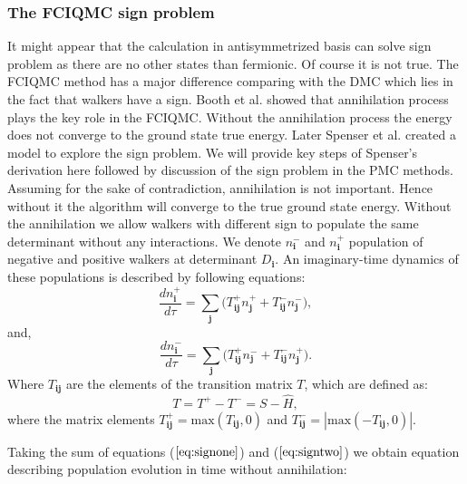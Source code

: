 \documentclass[twoside,english]{uiofysmaster}
\begin{document}
\subsubsection{The FCIQMC sign problem}
It might appear that the calculation in antisymmetrized basis can solve sign problem as there are no other states than fermionic. Of course it is not true.
The FCIQMC method has a major difference comparing with the DMC which lies in the fact that walkers have a sign. Booth et al. \cite{BoothFermionMonteCarlo2009} showed that annihilation process plays the key role in the FCIQMC. Without the annihilation process the energy does not converge to the ground state true energy. Later Spenser et al. \cite{Spencersignproblempopulation2012} created a model to explore the sign problem. We will provide key steps of Spenser's derivation here followed by discussion of the sign problem in the PMC methods.
Assuming for the sake of contradiction, annihilation is not important. Hence without it the algorithm will converge to the true ground state energy. Without the annihilation we allow walkers with different sign to populate the same determinant without any interactions. We denote $n_{\boldsymbol{i}}^-$ and $n_{\boldsymbol{i}}^+$ population of negative and positive walkers at determinant $D_{\boldsymbol{i}}$. An imaginary-time dynamics of these populations is described by following equations:
\begin{equation}\label{eq:signone}
\frac{d n_{\boldsymbol{i}}^+}{d \tau}=\sum_{\boldsymbol{j}}\big(T_{\boldsymbol{ij}}^+n_{\boldsymbol{j}}^+  + T_{\boldsymbol{ij}}^-n_{\boldsymbol{j}}^-\big),
\end{equation}
and,
\begin{equation}\label{eq:signtwo}
\frac{d n_{\boldsymbol{i}}^-}{d \tau}=\sum_{\boldsymbol{j}}\big(T_{\boldsymbol{ij}}^+n_{\boldsymbol{j}}^- +  T_{\boldsymbol{ij}}^-n_{\boldsymbol{j}}^+\big).
\end{equation}
Where $T_{\boldsymbol{ij}}$ are the elements of the transition matrix $T$, which are defined as:
\begin{equation}
	T = T^+ - T^- = S - \hat{H},
\end{equation}
where the matrix elements $T_{\boldsymbol{ij}}^+ = \text{max}(T_{\boldsymbol{ij}},0)$ and $T_{\boldsymbol{ij}}^- = |\text{max}(-T_{\boldsymbol{ij}},0)|$.

Taking the sum of equations ($\ref{eq:signone}$) and ($\ref{eq:signtwo}$) we obtain equation describing population evolution in time without annihilation: 
\end{document}
